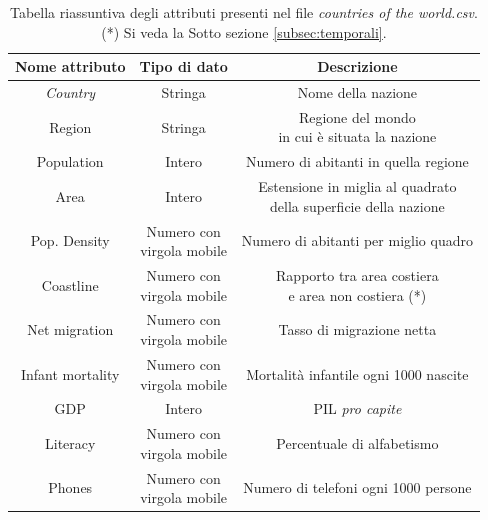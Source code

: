 \begin{table}
	\caption{Tabella riassuntiva degli attributi presenti nel file \textit{countries of the world.csv}.\\(*) Si veda la Sotto sezione \ref{subsec:temporali}.}

	\label{tab:world_countires_att}

	\centering
	\begin{tabular}{|c|c|c|}
		\hline
		\textbf{Nome attributo} & \textbf{Tipo di dato} & \textbf{Descrizione} \\ 
		\hline  
		\rule{0pt}{13pt}\emph{Country} & Stringa & Nome della nazione \\ 
		\hline  
		\rule{0pt}{24pt}Region & Stringa & \shortstack{Regione del mondo \\ in cui è situata la nazione} \\ 
		\hline  
		\rule{0pt}{13pt}Population & Intero & Numero di abitanti in quella regione \\ 
		\hline  
		\rule{0pt}{24pt}Area & Intero & \shortstack{Estensione in miglia al quadrato \\ della superficie della nazione} \\
		\hline   
		\rule{0pt}{24pt}Pop. Density & \shortstack{Numero con \\ virgola mobile} & Numero di abitanti per miglio quadro \\ 
		\hline   
		\rule{0pt}{24pt}Coastline & \shortstack{Numero con \\ virgola mobile} & \shortstack{Rapporto tra area costiera \\ e area non costiera (*)} \\ 
		\hline   
		\rule{0pt}{24pt}Net migration & \shortstack{Numero con \\ virgola mobile} & Tasso di migrazione netta \\ 
		\hline  
		\rule{0pt}{24pt}Infant mortality & \shortstack{Numero con \\ virgola mobile} & Mortalità infantile ogni 1000 nascite \\ 
		\hline  
		\rule{0pt}{13pt}GDP & Intero & PIL \textit{pro capite} \\ 
		\hline  
		\rule{0pt}{24pt}Literacy & \shortstack{Numero con \\ virgola mobile} & Percentuale di alfabetismo \\ 
		\hline  
		\rule{0pt}{24pt}Phones & \shortstack{Numero con \\ virgola mobile} & Numero di telefoni ogni 1000 persone \\ 

\end{tabular}
\end{table}
